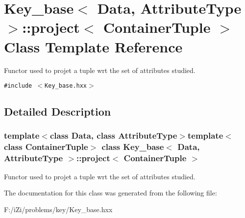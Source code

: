 \section{Key\_\-base$<$ Data, Attribute\-Type $>$::project$<$ Container\-Tuple $>$ Class Template Reference}
\label{class_key__base_1_1project}
Functor used to projet a tuple wrt the set of attributes studied.  


{\tt \#include $<$Key\_\-base.hxx$>$}



\subsection{Detailed Description}
\subsubsection*{template$<$class Data, class Attribute\-Type$>$template$<$class Container\-Tuple$>$ class Key\_\-base$<$ Data, Attribute\-Type $>$::project$<$ Container\-Tuple $>$}

Functor used to projet a tuple wrt the set of attributes studied. 



The documentation for this class was generated from the following file:\begin{CompactItemize}
\item 
F:/i\-Zi/problems/key/Key\_\-base.hxx\end{CompactItemize}

